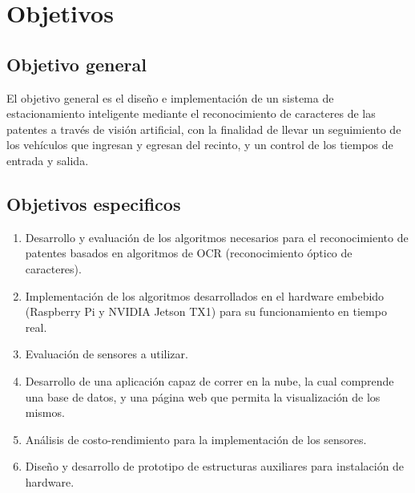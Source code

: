 \section{Objetivos}

\subsection*{Objetivo general}

El objetivo general es el diseño e implementación de un sistema de estacionamiento inteligente mediante el reconocimiento de caracteres de las patentes a través de visión artificial, con la finalidad de llevar un seguimiento de los vehículos que ingresan y egresan del recinto, y un control de los tiempos de entrada y salida.

\subsection*{Objetivos especificos}

\begin{enumerate}
    \item Desarrollo y evaluación de los algoritmos necesarios para el reconocimiento de patentes basados en algoritmos de OCR (reconocimiento óptico de caracteres).
    \item Implementación de los algoritmos desarrollados en el hardware embebido (Raspberry Pi y NVIDIA Jetson TX1) para su funcionamiento en tiempo real.
    \item Evaluación de sensores a utilizar.
    \item Desarrollo de una aplicación capaz de correr en la nube, la cual comprende una base de datos, y una página web que permita la visualización de los mismos.
    \item Análisis de costo-rendimiento para la implementación de los sensores.
    \item Diseño y desarrollo de prototipo de estructuras auxiliares para instalación de hardware.
\end{enumerate}






